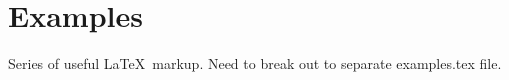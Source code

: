 
\newpage
\section{Examples}
Series of useful \LaTeX\ markup. Need to break out to 
separate examples.tex file.

